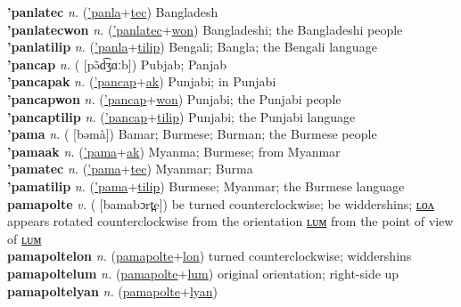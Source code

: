 \textbf{'panlatec} \textit{n.} (\hyperref['panla]{'panla}+\hyperref[tec]{tec})
Bangladesh \label{'panlatec} \\
\textbf{'panlatecwon} \textit{n.} (\hyperref['panlatec]{'panlatec}+\hyperref[won]{won})
Bangladeshi; the Bangladeshi people \label{'panlatecwon} \\
\textbf{'panlatilip} \textit{n.} (\hyperref['panla]{'panla}+\hyperref[tilip]{tilip})
Bengali; Bangla; the Bengali language \label{'panlatilip} \\
\textbf{'pancap} \textit{n.} ( [pə̃d͡ʒɑːb])
Pubjab; Panjab \label{'pancap} \\
\textbf{'pancapak} \textit{n.} (\hyperref['pancap]{'pancap}+\hyperref[ak]{ak})
Punjabi; in Punjabi \label{'pancapak} \\
\textbf{'pancapwon} \textit{n.} (\hyperref['pancap]{'pancap}+\hyperref[won]{won})
Punjabi; the Punjabi people \label{'pancapwon} \\
\textbf{'pancaptilip} \textit{n.} (\hyperref['pancap]{'pancap}+\hyperref[tilip]{tilip})
Punjabi; the Punjabi language \label{'pancaptilip} \\
\textbf{'pama} \textit{n.} ( [bəmà])
Bamar; Burmese; Burman; the Burmese people \label{'pama} \\
\textbf{'pamaak} \textit{n.} (\hyperref['pama]{'pama}+\hyperref[ak]{ak})
Myanma; Burmese; from Myanmar \label{'pamaak} \\
\textbf{'pamatec} \textit{n.} (\hyperref['pama]{'pama}+\hyperref[tec]{tec})
Myanmar; Burma \label{'pamatec} \\
\textbf{'pamatilip} \textit{n.} (\hyperref['pama]{'pama}+\hyperref[tilip]{tilip})
Burmese; Myanmar; the Burmese language \label{'pamatilip} \\
\textbf{pamapolte} \textit{v.} ( [bamabɔrt̪e])
be turned counterclockwise; be widdershins; \hyperref[pamapoltelon]{ʟᴏᴧ} appears rotated counterclockwise from the orientation \hyperref[pamapoltelum]{ʟᴜᴍ} from the point of view of \hyperref[pamapoltelum]{ʟᴜᴍ} \label{pamapolte} \\
\textbf{pamapoltelon} \textit{n.} (\hyperref[pamapolte]{pamapolte}+\hyperref[lon]{lon})
turned counterclockwise; widdershins \label{pamapoltelon} \\
\textbf{pamapoltelum} \textit{n.} (\hyperref[pamapolte]{pamapolte}+\hyperref[lum]{lum})
original orientation; right-side up \label{pamapoltelum} \\
\textbf{pamapoltelyan} \textit{n.} (\hyperref[pamapolte]{pamapolte}+\hyperref[lyan]{lyan})
